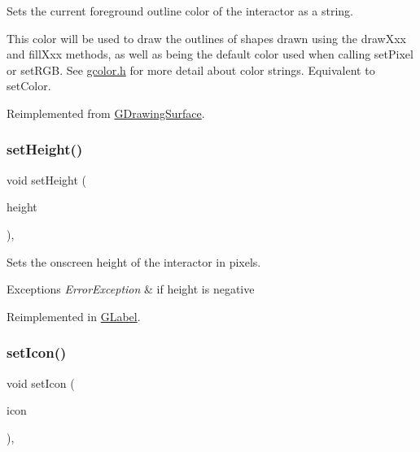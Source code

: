 Sets the current foreground outline color of the interactor as a string. 

This color will be used to draw the outlines of shapes drawn using the draw\+Xxx and fill\+Xxx methods, as well as being the default color used when calling set\+Pixel or set\+R\+GB. See \mbox{\hyperlink{gcolor_8h_source}{gcolor.\+h}} for more detail about color strings. Equivalent to set\+Color. 

Reimplemented from \mbox{\hyperlink{classGDrawingSurface_af59209aeadea6dfc6d97a2d8531f50e1}{G\+Drawing\+Surface}}.

\mbox{\label{classGInteractor_a9e280bfc4544dfaf8e4376c4e1a74357}} 
\subsubsection{\texorpdfstring{set\+Height()}{setHeight()}}
{\footnotesize\ttfamily void set\+Height (\begin{DoxyParamCaption}\item[{double}]{height }\end{DoxyParamCaption})\hspace{0.3cm}{\ttfamily [virtual]}, {\ttfamily [inherited]}}



Sets the onscreen height of the interactor in pixels. 


\begin{DoxyExceptions}{Exceptions}
{\em Error\+Exception} & if height is negative \\
\hline
\end{DoxyExceptions}


Reimplemented in \mbox{\hyperlink{classGLabel_a5eead864d1249c4406f32f9944ed1503}{G\+Label}}.

\mbox{\label{classGInteractor_a542abfcd7261751352af129c7215ecda}} 
\subsubsection{\texorpdfstring{set\+Icon()}{setIcon()}\hspace{0.1cm}{\footnotesize\ttfamily [1/3]}}
{\footnotesize\ttfamily void set\+Icon (\begin{DoxyParamCaption}\item[{const Q\+Icon \&}]{icon }\end{DoxyParamCaption})\hspace{0.3cm}{\ttfamily [virtual]}, {\ttfamily [inherited]}}



